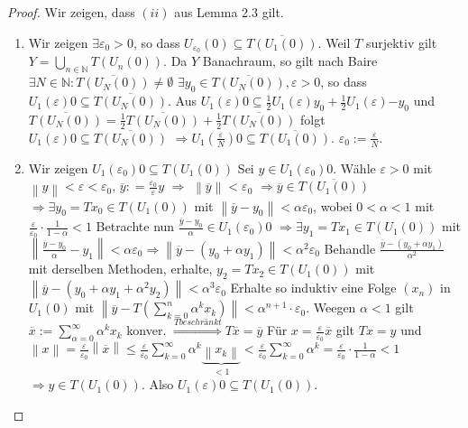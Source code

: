 \documentclass[ngerman]{report}
\theoremstyle{plain}%
\theoremstyle{definition}%
\theoremstyle{myStyle}
\newcommand{\N}{\mathbb{N}}
\newcommand{\norm}[1]{\left \|#1\right\| }
\newcommand{\df}[1][]{%
	\overset{#1}{\Rightarrow}
}
\newcommand{\U}[2][1]{U_{#1}(#2)} %
\begin{document}
 	\begin{proof}
 		Wir zeigen, dass $(ii)$ aus Lemma 2.3 gilt.
 		\begin{enumerate}[1. {Schritt}]
 			\item Wir zeigen $\exists \varepsilon_0 > 0$, so dass $U_{\varepsilon_0}(0) \subseteq \overline{T(U_1(0))}.$ Weil $T$ surjektiv gilt $Y = \bigcup_{n\in\N} T(U_n(0))$.
 			Da $Y$ Banachraum, so gilt nach Baire
 			$\exists N\in\N: \overline{T(U_N(0))} \neq \emptyset$
 			$\exists y_0 \in \overline{T(U_N(0))}, \varepsilon > 0$, so dass 
 			$\U{\varepsilon}{0} \subseteq \overline{T(U_N(0))}$.
 			Aus $\U{\varepsilon}{0} \subseteq \frac{1}{2} \U{\varepsilon}{y_0} + \frac{1}{2} \U{\varepsilon}{-y_0}$ und 
 			$\overline{T(U_N(0))} = \frac{1}{2} \overline{T(U_N(0))} + \frac{1}{2} \overline{T(U_N(0))} $		
 			folgt $ \U{\varepsilon}{0} \subseteq \overline{T(U_N(0))}$
 			$\df \U{\frac{\varepsilon}{N}}{0} \subseteq \overline{T(U_1(0))}$.
 			$\varepsilon_0 := \frac{\varepsilon}{N}$.
 			\item Wir zeigen $\U{\varepsilon_0}{0} \subseteq {T(U_1(0))}$
 			Sei $y\in \U{\varepsilon_0}{0}$. Wähle $\varepsilon > 0$ mit $ \norm{y} < \varepsilon < \varepsilon_0$, $\overline{y} : = \frac{\varepsilon_0}{\varepsilon} y$ 
 			$\df$ $\norm{\overline{y}} < \varepsilon_0$
 			$\df \overline{y} \in \overline{T(U_1(0))}$
 			$\df \exists y_0 = Tx_0 \in {T(U_1(0))}$ mit $\norm{\overline{y} - y_0} < \alpha \varepsilon_0$, wobei $0 < \alpha < 1$ mit $\frac{\varepsilon}{\varepsilon_0} \cdot \frac{1}{1-\alpha} < 1$
 			Betrachte nun $\frac{\overline{y} - y_0}{\alpha} \in \U{\varepsilon_0}{0}$
 			$\df \exists y_1 = Tx_1 \in {T(U_1(0))}$ mit $\norm{\frac{\overline{y}-y_0}{\alpha} - y_1} < \alpha \varepsilon_0
 			\df \norm{\overline{y} - (y_0 + \alpha y_1)} < \alpha^2 \varepsilon_0$
 			Behandle $\frac{\overline{y} - (y_0 +\alpha y_1)}{\alpha^2}$ mit derselben Methoden,
 			erhalte, $y_2 = Tx_2 \in {T(U_1(0))}$ mit $\norm{\overline{y} - (y_0 + \alpha y_1 + \alpha^2 y_2)} < \alpha^3 \varepsilon_0$
 			Erhalte so induktiv eine Folge $(x_n)$ in $\U{0}$ mit $\norm{\overline{y} - T(\sum_{k=0}^n \alpha^k x_k)} < \alpha^{n+1} \cdot \varepsilon_0$.
 			Weegen $\alpha < 1$ gilt $\overline{x} := \sum_{\alpha=0}^\infty \alpha^k x_k$ konver.
 			$\df[T beschränkt] T\overline{x} = \overline{y}$ Für $x = \frac{\varepsilon}{\varepsilon_0} \overline{x}$
 		gilt $Tx = y$ und  
 		$\norm{x} = \frac{\varepsilon}{\varepsilon_0} \norm{\overline{x}} \leq \frac{\varepsilon}{\varepsilon_0} \sum_{k=0}^\infty \alpha^k \underbrace{\norm{x_k}}_{< 1} < \frac{\varepsilon}{\varepsilon_0} \sum_{k=0}^\infty \alpha^k = \frac{\varepsilon}{\varepsilon_0} \cdot \frac{1}{1-\alpha} < 1$
 		$\df y\in T(U_1(0)).$ Also $\U{\varepsilon}{0} \subseteq T(U_1(0))$.
 		\end{enumerate}
 	\end{proof}
\end{document}
